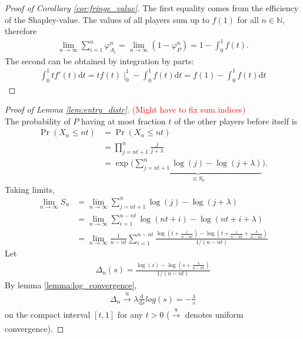 \documentclass[a4paper]{article}
\newcommand{\dt}{\mathrm{d}t}
\begin{document}
\begin{proof}[Proof of Corollary \ref{cor:fringe_value}]
    The first equality comes from the efficiency of the Shapley-value. The values of all players sum up to $f(1)$ for all $n \in \mathbb{N}$, therefore
    \begin{align*}
        \lim_{n \to \infty} \sum_{i=1}^n \varphi_{A_i}^n = \lim_{n \to \infty} (1 - \varphi_P^n ) = 1 - \int_0^1 f(t).
    \end{align*}
    The second can be obtained by integration by parts:
    \begin{align*}
        \int_0^1 t f'(t) \dt = tf(t) \mid_0^1 - \int_0^1 f(t) \dt = f(1) - \int_0^1 f(t) \dt
    \end{align*}
\end{proof}

\begin{proof}[Proof of Lemma \ref{lem:entry_distr}] \textcolor{red}{(Might have to fix sum indices)} \\
    The probability of $P$ having at most fraction $t$ of the other players before itself is
    \begin{align*}
        \Pr(X_n \leq nt) &= \Pr(X_n \leq nt ) \\
        &= \prod_{j = nt + 1}^n \frac{j}{j + \lambda} \\
        &= \exp \Bigg( \underbrace{\sum_{j = nt + 1}^n \log(j) - \log(j+\lambda)}_{\equiv S_n} \Bigg).
    \end{align*}
    Taking limits,
    \begin{align*}
        \lim_{n \to \infty} S_n &= \lim_{n \to \infty} \sum_{j = nt + 1}^n \log(j) - \log(j+\lambda) \\
        &= \lim_{n \to \infty} \sum_{i = 1}^{n - nt} \log(nt + i) - \log(nt + i + \lambda) \\
        &= \lim_{n \to \infty} \frac{1}{n - nt} \sum_{i = 1}^{n - nt} \frac{\log \left( t + \frac{i}{n - nt} \right) - \log \left( t + \frac{i}{n - nt} + \frac{\lambda}{n - nt} \right)}{1 / (n - nt)}
    \end{align*}
    Let
    \begin{align*}
        \Delta_n(s) = \frac{\log \left( s \right) - \log \left( s + \frac{\lambda}{n - nt} \right)}{1 / (n - nt)}
    \end{align*}
    By lemma \ref{lemma:log_convergence}, 
    \begin{align*}
        \Delta_n \xrightarrow[]{\mathrm{u}} \lambda \frac{\mathrm{d}}{\mathrm{d}s}log(s) = -\frac{\lambda}{s}
    \end{align*}
    on the compact interval $[t, 1]$ for any $t > 0$ ($\xrightarrow[]{\mathrm{u}}$ denotes uniform convergence).
    

\end{proof}
\end{document}
